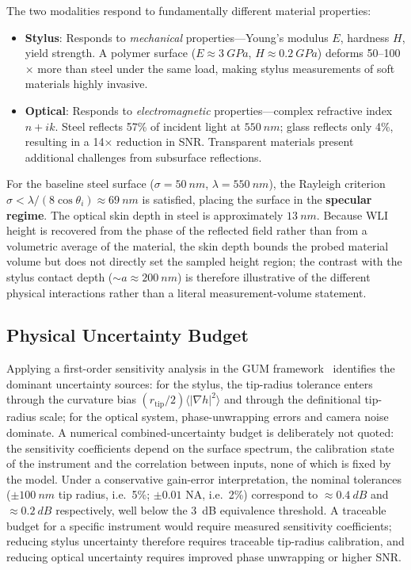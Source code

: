 \documentclass[review,12pt]{elsarticle}
\begin{document}
The two modalities respond to fundamentally different material properties:
\begin{itemize}
    \item \textbf{Stylus}: Responds to \emph{mechanical} properties---Young's modulus $E$, hardness $H$, yield strength. A polymer surface ($E \approx \SI{3}{GPa}$, $H \approx \SI{0.2}{GPa}$) deforms 50--100$\times$ more than steel under the same load, making stylus measurements of soft materials highly invasive.
    \item \textbf{Optical}: Responds to \emph{electromagnetic} properties---complex refractive index $n+ik$. Steel reflects 57\% of incident light at $\SI{550}{nm}$; glass reflects only 4\%, resulting in a 14$\times$ reduction in SNR. Transparent materials present additional challenges from subsurface reflections.
\end{itemize}

For the baseline steel surface ($\sigma = \SI{50}{nm}$, $\lambda = \SI{550}{nm}$), the Rayleigh criterion $\sigma < \lambda/(8\cos\theta_i) \approx \SI{69}{nm}$ is satisfied, placing the surface in the \textbf{specular regime}. The optical skin depth in steel is approximately $\SI{13}{nm}$. Because WLI height is recovered from the phase of the reflected field rather than from a volumetric average of the material, the skin depth bounds the probed material volume but does not directly set the sampled height region; the contrast with the stylus contact depth ($\sim a \approx \SI{200}{nm}$) is therefore illustrative of the different physical interactions rather than a literal measurement-volume statement.

\subsection{Physical Uncertainty Budget}

Applying a first-order sensitivity analysis in the GUM framework~\cite{jcgm2008gum} identifies the dominant uncertainty sources: for the stylus, the tip-radius tolerance enters through the curvature bias $(r_\mathrm{tip}/2)\langle|\nabla h|^2\rangle$ and through the definitional tip-radius scale; for the optical system, phase-unwrapping errors and camera noise dominate. A numerical combined-uncertainty budget is deliberately not quoted: the sensitivity coefficients depend on the surface spectrum, the calibration state of the instrument and the correlation between inputs, none of which is fixed by the model. Under a conservative gain-error interpretation, the nominal tolerances ($\pm\SI{100}{nm}$ tip radius, i.e.\ 5\%; $\pm0.01$ NA, i.e.\ 2\%) correspond to $\approx\SI{0.4}{dB}$ and $\approx\SI{0.2}{dB}$ respectively, well below the \SI{3}{dB} equivalence threshold. A traceable budget for a specific instrument would require measured sensitivity coefficients; reducing stylus uncertainty therefore requires traceable tip-radius calibration, and reducing optical uncertainty requires improved phase unwrapping or higher SNR.
\end{document}
